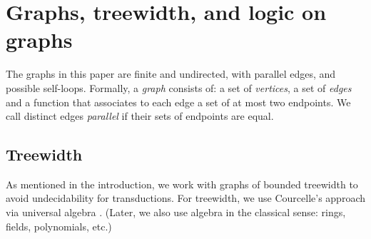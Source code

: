 \section{Graphs, treewidth, and logic on graphs}
The graphs in this paper are finite and undirected, with parallel edges, and possible self-loops. Formally, a \emph{graph} consists of: a set of \emph{vertices}, a set of \emph{edges} and a function that associates to each edge a set of at most two endpoints. We call distinct edges \emph{parallel} if their sets of endpoints are equal.
\subsection{Treewidth} 
\label{sec:treewidth-definition}
As mentioned in the introduction, we work with graphs of bounded treewidth to avoid undecidability for \mso transductions. 
For treewidth, we use Courcelle's  approach via universal algebra \cite{courcelleEtAlAlgebraicTheoryOfGraphReduction93}. (Later, we also use algebra in the classical sense: rings, fields, polynomials, etc.)


